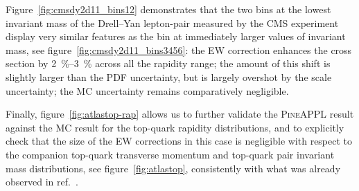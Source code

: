 Figure~\ref{fig:cmsdy2d11_bins12} demonstrates that the two bins at the
lowest invariant mass of the Drell--Yan lepton-pair measured by the CMS
experiment display very similar features as the bin at immediately larger
values of invariant mass, see figure~\ref{fig:cmsdy2d11_bins3456}: the EW
correction enhances the cross section by \SIrange{2}{3}{\percent} across all the
rapidity range; the amount of this shift is slightly larger than the PDF
uncertainty, but is largely overshot by the scale uncertainty; the MC
uncertainty remains comparatively negligible.

Finally, figure~\ref{fig:atlastop-rap} allows us to further validate the
\textsc{PineAPPL} result against the MC result for the top-quark
rapidity distributions, and to explicitly check that the size of the EW
corrections in this case is negligible with respect to the companion
top-quark transverse momentum and top-quark pair invariant mass distributions,
see figure~\ref{fig:atlastop}, consistently with what was already observed in
ref.~\cite{Czakon:2017wor}.
